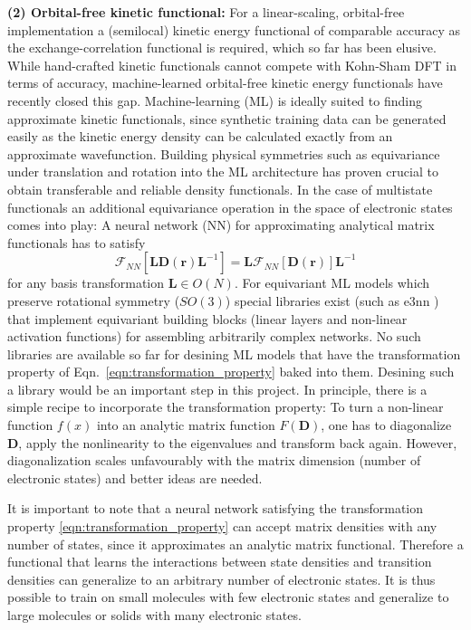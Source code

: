\documentclass[12pt]{article}
\newcommand\m[1]{\mathbf{#1}}
\renewcommand\vec[1]{\mathbf{#1}}
\begin{document}

\textbf{(2) Orbital-free kinetic functional:}
For a linear-scaling, orbital-free implementation a (semilocal) kinetic energy functional of comparable accuracy as the exchange-correlation functional is required, which so far has been elusive. While hand-crafted kinetic functionals cannot compete with Kohn-Sham DFT in terms of accuracy, machine-learned orbital-free kinetic energy functionals have recently closed this gap. \cite{Zhang2024overcoming} Machine-learning (ML) is ideally suited to finding approximate kinetic functionals, since synthetic training data can be generated easily as the kinetic energy density can be calculated exactly from an approximate wavefunction. Building physical symmetries such as equivariance under translation and rotation into the ML architecture has proven crucial to obtain transferable and reliable density functionals. \cite{Gong2023general} 
In the case of multistate functionals an additional equivariance operation in the space of electronic states comes into play:
A neural network (NN) for approximating analytical matrix functionals has to satisfy
\begin{equation}
\mathcal{F}_{NN}[\m{L} \m{D}(\vec{r}) \m{L}^{-1}] = \m{L} \mathcal{F}_{NN}[\m{D}(\vec{r})] \m{L}^{-1} \label{eqn:transformation_property}
\end{equation}
for any basis transformation $\m{L} \in O(N)$. For equivariant ML models which preserve rotational symmetry ($SO(3)$) special libraries exist (such as e3nn \cite{Geiger2022e3nn}) that implement equivariant building blocks (linear layers and non-linear activation functions)
for assembling arbitrarily complex networks.
No such libraries are available so far for desining ML models that have the transformation property of Eqn.~\ref{eqn:transformation_property} baked into them. Desining such a library would be an important step in this project. In principle, there is a simple recipe to incorporate the transformation property: To turn a non-linear function $f(x)$ into an analytic matrix function $F(\m{D})$, one has to diagonalize $\m{D}$, apply the nonlinearity to the eigenvalues and transform back again. However, diagonalization scales unfavourably with the matrix dimension (number of electronic states) and better ideas are needed.

It is important to note that a neural network satisfying the transformation property \ref{eqn:transformation_property} can accept matrix densities with any number of states, since it approximates an analytic matrix functional. Therefore a functional that learns the interactions between state densities and transition densities can generalize to an arbitrary number of electronic states. It is thus possible to train on small molecules with few electronic states and generalize to large molecules or solids with many electronic states.
\end{document}
